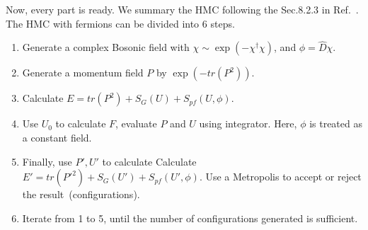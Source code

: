 Now, every part is ready. We summary the HMC following the Sec.8.2.3 in Ref.~\cite{latticeqcdbook2010}. The HMC with fermions can be divided into 6 steps.

\begin{enumerate}
  \item Generate a complex Bosonic field with $\chi \sim \exp (-\chi ^{\dagger}\chi)$, and $\phi = \hat{D} \chi$.
  \item Generate a momentum field $P$ by $\exp (-tr(P^2))$.
  \item Calculate $E=tr(P^2)+S_G(U)+S_{pf}(U,\phi)$.
  \item Use $U_0$ to calculate $F$, evaluate $P$ and $U$ using integrator. Here, $\phi$ is treated as a constant field.
  \item Finally, use $P',U'$ to calculate Calculate $E'=tr({P'}^2)+S_G(U')+S_{pf}(U',\phi)$. Use a Metropolis to accept or reject the result~(configurations).
  \item Iterate from 1 to 5, until the number of configurations generated is sufficient.
\end{enumerate}




